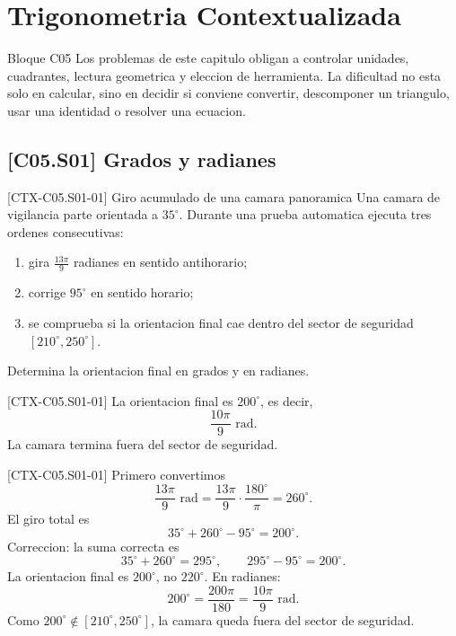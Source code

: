 \chapter{Trigonometria Contextualizada}

\begin{planningbox}{Bloque C05}
Los problemas de este capitulo obligan a controlar unidades, cuadrantes, lectura geometrica y
eleccion de herramienta. La dificultad no esta solo en calcular, sino en decidir si conviene
convertir, descomponer un triangulo, usar una identidad o resolver una ecuacion.
\end{planningbox}

\section{[C05.S01] Grados y radianes}

\begin{exercise}{[CTX-C05.S01-01] Giro acumulado de una camara panoramica}
Una camara de vigilancia parte orientada a \(35^\circ\). Durante una prueba automatica ejecuta
tres ordenes consecutivas:
\begin{enumerate}
  \item gira \(\frac{13\pi}{9}\) radianes en sentido antihorario;
  \item corrige \(95^\circ\) en sentido horario;
  \item se comprueba si la orientacion final cae dentro del sector de seguridad
  \([210^\circ,250^\circ]\).
\end{enumerate}

Determina la orientacion final en grados y en radianes.
\end{exercise}

\begin{shortanswer}{[CTX-C05.S01-01]}
La orientacion final es \(200^\circ\), es decir,
\[
\frac{10\pi}{9}\text{ rad}.
\]
La camara termina fuera del sector de seguridad.
\end{shortanswer}

\begin{fullsolution}{[CTX-C05.S01-01]}
Primero convertimos
\[
\frac{13\pi}{9}\text{ rad}=\frac{13\pi}{9}\cdot \frac{180^\circ}{\pi}=260^\circ.
\]
El giro total es
\[
35^\circ+260^\circ-95^\circ=200^\circ.
\]
Correccion: la suma correcta es
\[
35^\circ+260^\circ=295^\circ,\qquad 295^\circ-95^\circ=200^\circ.
\]
La orientacion final es \(200^\circ\), no \(220^\circ\). En radianes:
\[
200^\circ=\frac{200\pi}{180}=\frac{10\pi}{9}\text{ rad}.
\]
Como \(200^\circ\notin [210^\circ,250^\circ]\), la camara queda fuera del sector de seguridad.
\end{fullsolution}

